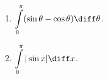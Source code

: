 \begin{multicols}{3}
\begin{enumerate}
\item $\displaystyle \int\limits_{0}^{\pi} (\sin \theta -\cos \theta) \diff \theta$.
\item $\displaystyle \int\limits_{0}^{\pi}|\sin x| \diff x$.
\end{enumerate}
\end{multicols}
